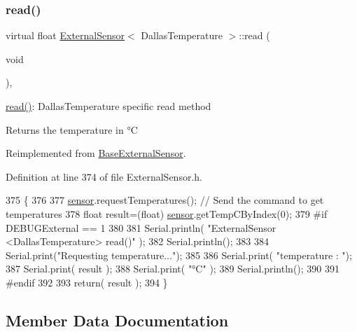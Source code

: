 \subsubsection{\texorpdfstring{read()}{read()}}
{\footnotesize\ttfamily virtual float \hyperlink{class_external_sensor}{External\+Sensor}$<$ Dallas\+Temperature $>$\+::read (\begin{DoxyParamCaption}\item[{void}]{ }\end{DoxyParamCaption})\hspace{0.3cm}{\ttfamily [inline]}, {\ttfamily [virtual]}}

\hyperlink{class_external_sensor_3_01_dallas_temperature_01_4_a1e725d9338314515d4e5dc456ed6a6c8}{read()}\+: Dallas\+Temperature specific read method

\begin{DoxyReturn}{Returns}
the temperature in °C 
\end{DoxyReturn}


Reimplemented from \hyperlink{class_base_external_sensor_a1564f16deacf57b51b9948ac29db4291}{Base\+External\+Sensor}.



Definition at line 374 of file External\+Sensor.\+h.


\begin{DoxyCode}
375     \{
376 
377         \hyperlink{class_external_sensor_3_01_dallas_temperature_01_4_adb6ba4fcdedef95ad8f6b0c9b6c0f9d1}{sensor}.requestTemperatures(); \textcolor{comment}{// Send the command to get temperatures}
378         \textcolor{keywordtype}{float} result=(float) \hyperlink{class_external_sensor_3_01_dallas_temperature_01_4_adb6ba4fcdedef95ad8f6b0c9b6c0f9d1}{sensor}.getTempCByIndex(0);
379 \textcolor{preprocessor}{    #if DEBUGExternal == 1 }
380 
381         Serial.println( \textcolor{stringliteral}{"ExternalSensor <DallasTemperature> read()"} );
382         Serial.println();
383 
384         Serial.print(\textcolor{stringliteral}{"Requesting temperature..."});
385 
386         Serial.print( \textcolor{stringliteral}{"temperature : "});
387         Serial.print( result );
388         Serial.print( \textcolor{stringliteral}{"°C"} );
389         Serial.println();
390     
391 \textcolor{preprocessor}{    #endif}
392         
393         \textcolor{keywordflow}{return}( result );
394     \}
\end{DoxyCode}


\subsection{Member Data Documentation}
\mbox{\label{class_external_sensor_3_01_dallas_temperature_01_4_a7d9e9d2893e453638fcf440e5d8d9082}} 
